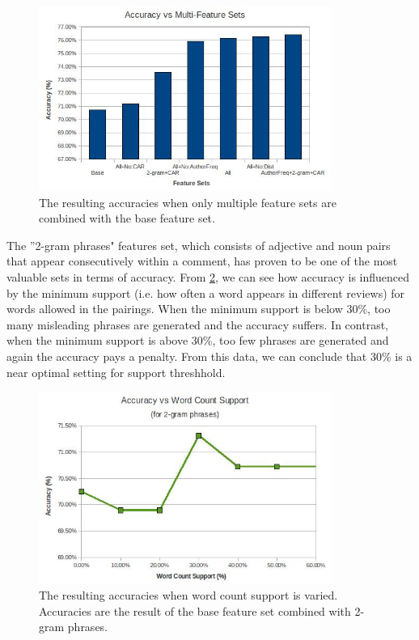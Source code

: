 \documentclass[]{report}
\begin{document}
\begin{figure}[H]
\centering
\includegraphics[width=3.77in]{AccuracyVsMultiFeatureSets.jpg}
\caption{The resulting accuracies when only multiple feature sets are combined with the base feature set.}
\label{fig:MultiFeatureSets}
\end{figure}

The ''2-gram phrases" features set, which consists of adjective and noun pairs that appear consecutively within a comment, has proven to be one of the most valuable sets in terms of accuracy.  From \ref{fig:WordCountSupport}, we can see how accuracy is influenced by the minimum support (i.e. how often a word appears in different reviews) for words allowed in the pairings.  When the minimum support is below 30\%, too many misleading phrases are generated and the accuracy suffers.  In contrast, when the minimum support is above 30\%, too few phrases are generated and again the accuracy pays a penalty.  From this data, we can conclude that 30\% is a near optimal setting for support threshhold. 

\begin{figure}[H]
\centering
\includegraphics[width=3.77in]{AccuracyVsWordCountSupport.jpg}
\caption{The resulting accuracies when word count support is varied.  Accuracies are the result of the base feature set combined with 2-gram phrases.}
\label{fig:WordCountSupport}
\end{figure}
\end{document}
